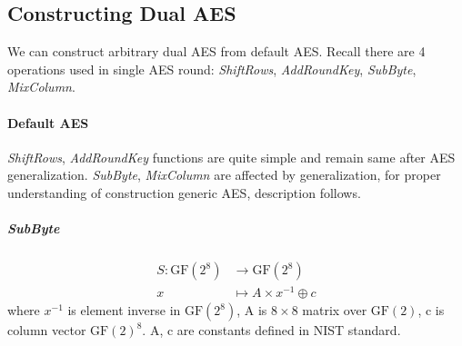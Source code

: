 \documentclass[11pt,oneside,final]{fithesis2}
\newcommand{\gfe}{\ensuremath{\text{GF}\left(2^8\right)}}
\begin{document}
	\subsection{Constructing Dual AES}
	We can construct arbitrary dual AES from default AES. Recall there are 4 operations used in single AES round: \emph{ShiftRows}, \emph{AddRoundKey}, \emph{SubByte}, \emph{MixColumn}.

	\paragraph*{Default AES}
	\emph{ShiftRows}, \emph{AddRoundKey} functions are quite simple and remain same after AES generalization. \emph{SubByte}, \emph{MixColumn} are affected by 
	generalization, for proper understanding of construction generic AES, description follows.

	\subparagraph*{SubByte}\label{sec:aes_subbyte}
	\begin{equation}
	\begin{aligned}
	S: \gfe         & \longrightarrow  \gfe\\
	x               & \longmapsto A \times x^{-1} \oplus c
	\end{aligned}
	\end{equation}
	where $x^{-1}$ is element inverse in $\gfe$, A is $8 \times 8$ matrix over $\text{GF}(2)$, c is column vector $\text{GF}(2)^8$. A, c are constants defined in NIST standard.
\end{document}
